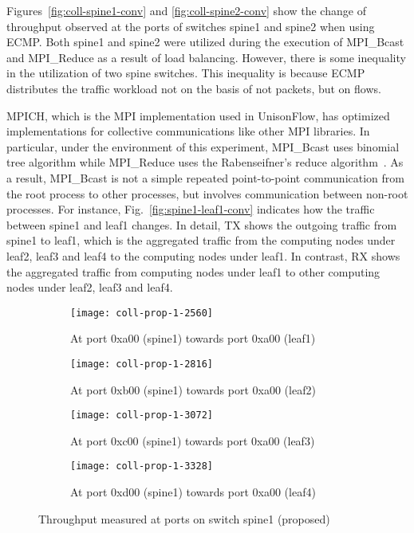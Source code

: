 Figures~\ref{fig:coll-spine1-conv} and \ref{fig:coll-spine2-conv} show
the change of throughput observed at the ports of switches spine1 and
spine2 when using ECMP\@. Both spine1 and spine2 were utilized during the
execution of MPI\_Bcast and MPI\_Reduce as a result of load balancing.
However, there is some inequality in the utilization of two spine
switches. This inequality is because ECMP distributes the traffic
workload not on the basis of not packets, but on flows.

MPICH, which is the MPI implementation used in UnisonFlow, has optimized
implementations for collective communications like other MPI libraries.
In particular, under the environment of this experiment, MPI\_Bcast uses
binomial tree algorithm while MPI\_Reduce uses the Rabenseifner's reduce
algorithm~\autocite{Rabenseifner2004}. As a result, MPI\_Bcast is not a
simple repeated point-to-point communication from the root process to
other processes, but involves communication between non-root processes.
For instance, Fig.~\ref{fig:spine1-leaf1-conv} indicates how the traffic
between spine1 and leaf1 changes. In detail, TX shows the outgoing
traffic from spine1 to leaf1, which is the aggregated traffic from the
computing nodes under leaf2, leaf3 and leaf4 to the computing nodes
under leaf1. In contrast, RX shows the aggregated traffic from computing
nodes under leaf1 to other computing nodes under leaf2, leaf3 and leaf4.

\begin{figure}
    \centering
    \begin{subfigure}{.45\linewidth}
        \texttt{[image: coll-prop-1-2560]}
        \caption{At port 0xa00 (spine1) \newline towards port 0xa00 (leaf1)}%
        \label{fig:spine1-leaf1-prop}
    \end{subfigure}
    \begin{subfigure}{.45\linewidth}
        \texttt{[image: coll-prop-1-2816]}
        \caption{At port 0xb00 (spine1) \newline towards port 0xa00 (leaf2)}%
        \label{fig:spine1-leaf2-prop}
    \end{subfigure}
    \begin{subfigure}{.45\linewidth}
        \texttt{[image: coll-prop-1-3072]}
        \caption{At port 0xc00 (spine1) \newline towards port 0xa00 (leaf3)}%
        \label{fig:spine1-leaf3-prop}
    \end{subfigure}
    \begin{subfigure}{.45\linewidth}
        \texttt{[image: coll-prop-1-3328]}
        \caption{At port 0xd00 (spine1) \newline towards port 0xa00 (leaf4)}%
        \label{fig:spine1-leaf4-prop}
    \end{subfigure}
    \caption{Throughput measured at ports on switch spine1 (proposed)}%
    \label{fig:coll-spine1-prop}
\end{figure}


